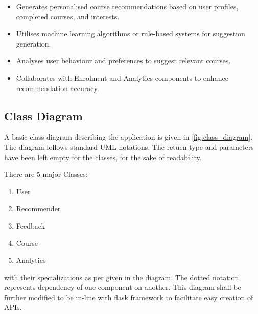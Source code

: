     \begin{itemize}[label=]
        \tightlist
        \item Generates personalised course recommendations based on user profiles, completed courses, and interests.
        \item Utilises machine learning algorithms or rule-based systems for suggestion generation.
        \item Analyses user behaviour and preferences to suggest relevant courses.
        \item Collaborates with Enrolment and Analytics components to enhance recommendation accuracy.
    \end{itemize}

\subsection{Class Diagram}
A basic class diagram describing the application is given in \autoref{fig:class_diagram}. The diagram follows standard UML notations. The retuen type and parameters have been left empty for the classes, for the sake of readability.

There are 5 major Classes: 
\begin{enumerate}
    \tightlist
    \item User
    \item Recommender
    \item Feedback
    \item Course
    \item Analytics
\end{enumerate}
with their specializations as per given in the diagram. The dotted notation represents dependency of one component on another. This diagram shall be further modified to be in-line with flask framework to facilitate easy creation of APIs.

